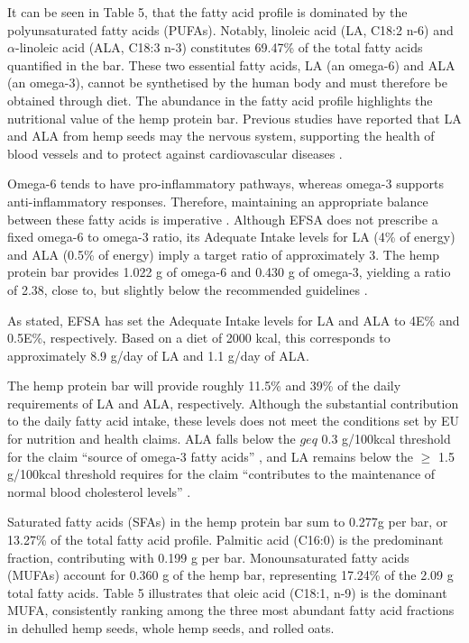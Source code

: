 \vspace{1em}
It can be seen in Table 5, that the fatty acid profile is dominated by the polyunsaturated fatty acids (PUFAs). Notably, linoleic acid (LA, C18:2 n-6) and $\alpha$-linoleic acid (ALA, C18:3 n-3) constitutes 69.47\% of the total fatty acids quantified in the bar. These two essential fatty acids, LA (an omega-6) and ALA (an omega-3), cannot be synthetised by the human body and must therefore be obtained through diet. The abundance in the fatty acid profile highlights the nutritional value of the hemp protein bar. Previous studies have reported that LA and ALA from hemp seeds may the nervous system, supporting the health of blood vessels and to protect against cardiovascular diseases \cite*{art_21_hemp_review}. 

\vspace{1em}
Omega-6 tends to have pro-inflammatory pathways, whereas omega-3 supports anti-inflammatory responses. Therefore, maintaining an appropriate balance between these fatty acids is imperative \cite*{art_21_hemp_review}. Although EFSA does not prescribe a fixed omega-6 to omega-3 ratio, its Adequate Intake levels for LA (4\% of energy) and ALA (0.5\% of energy) imply a target ratio of approximately 3. The hemp protein bar provides 1.022 g of omega-6 and 0.430 g of omega-3, yielding a ratio of 2.38, close to, but slightly below the recommended guidelines \cite*{art_22_efsa_fats}. 

\vspace{1em}
As stated, EFSA has set the Adequate Intake levels for LA and ALA to 4E\% and 0.5E\%, respectively. Based on a diet of 2000 kcal, this corresponds to approximately 8.9 g/day of LA and 1.1 g/day of ALA. 



\vspace{1em}
The hemp protein bar will provide roughly 11.5\% and 39\% of the daily requirements of LA and ALA, respectively. Although the substantial contribution to the daily fatty acid intake, these levels does not meet the conditions set by EU for nutrition and health claims. ALA falls below the $geq$ 0.3 g/100kcal threshold for the claim “source of omega-3 fatty acids” \cite*{art_23_regulation1162010}, and LA remains below the $\geq$ 1.5 g/100kcal threshold requires for the claim “contributes to the maintenance of normal blood cholesterol levels” \cite*{art_24_oat_kilning}.

\vspace{1em}
Saturated fatty acids (SFAs) in the hemp protein bar sum to 0.277g per bar, or 13.27\% of the total fatty acid profile. Palmitic acid (C16:0) is the predominant fraction, contributing with 0.199 g per bar. 
Monounsaturated fatty acids (MUFAs) account for 0.360 g of the hemp bar, representing 17.24\% of the 2.09 g total fatty acids. Table 5 illustrates that oleic acid (C18:1, n-9) is the dominant MUFA, consistently ranking among the three most abundant fatty acid fractions in dehulled hemp seeds, whole hemp seeds, and rolled oats. 


